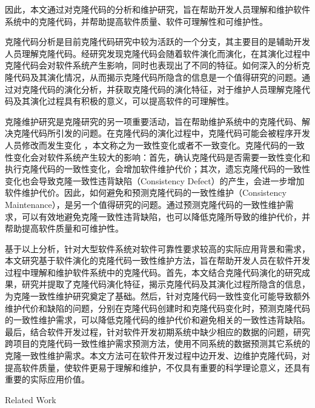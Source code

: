 因此，本文通过对克隆代码的分析和维护研究，旨在帮助开发人员理解和维护软件系统中的克隆代码，并帮助提高软件质量、软件可理解性和可维护性。

克隆代码分析是目前克隆代码研究中较为活跃的一个分支，其主要目的是辅助开发人员理解克隆代码。经研究发现克隆代码会随着软件演化而演化\cite{kim2005empirical}\cite{saha2011automatic}，在其演化过程中克隆代码会对软件系统产生影响，同时也表现出了不同的特征\cite{gode2011frequency}\cite{mondal2012dispersion}\cite{rahman2014change}。如何深入的分析克隆代码及其演化情况，从而揭示克隆代码所隐含的信息是一个值得研究的问题。通过对克隆代码的演化分析，并获取克隆代码的演化特征，对于维护人员理解克隆代码及其演化过程具有积极的意义，可以提高软件的可理解性。

克隆维护研究是克隆研究的另一项重要活动，旨在帮助维护系统中的克隆代码、解决克隆代码所引发的问题。在克隆代码的演化过程中，克隆代码可能会被程序开发人员修改而发生变化\cite{krinke2007study}\cite{aversano2007clones} ，本文称之为一致性变化或者不一致变化。克隆代码的一致性变化会对软件系统产生较大的影响：首先，确认克隆代码是否需要一致性变化和执行克隆代码的一致性变化，会增加软件维护代价；其次，遗忘克隆代码的一致性变化也会导致克隆一致性违背缺陷（Consistency Defect）的产生\cite{juergens2009code}\cite{wagner2016relationship}，会进一步增加软件维护代价。因此，如何避免和预测克隆代码的一致性维护（Consistency Maintenance），是另一个值得研究的问题。通过预测克隆代码的一致性维护需求，可以有效地避免克隆一致性违背缺陷，也可以降低克隆所导致的维护代价，并帮助提高软件质量和可维护性。

基于以上分析，针对大型软件系统对软件可靠性要求较高的实际应用背景和需求，本文研究基于软件演化的克隆代码一致性维护方法，旨在帮助开发人员在软件开发过程中理解和维护软件系统中的克隆代码。首先，本文结合克隆代码演化的研究成果，研究并提取了克隆代码演化特征，揭示克隆代码及其演化过程所隐含的信息，为克隆一致性维护研究奠定了基础。然后，针对克隆代码一致性变化可能导致额外维护代价和缺陷的问题，分别在克隆代码创建时和克隆代码变化时，预测克隆代码的一致性维护需求，可以降低克隆代码的维护代价和避免相关的一致性违背缺陷。最后，结合软件开发过程，针对软件开发初期系统中缺少相应的数据的问题，研究跨项目的克隆代码一致性维护需求预测方法，使用不同系统的数据预测其它系统的克隆一致性维护需求。本文方法可在软件开发过程中边开发、边维护克隆代码，对提高软件质量，使软件更易于理解和维护，不仅具有重要的科学理论意义，还具有重要的实际应用价值。


{Related Work}

